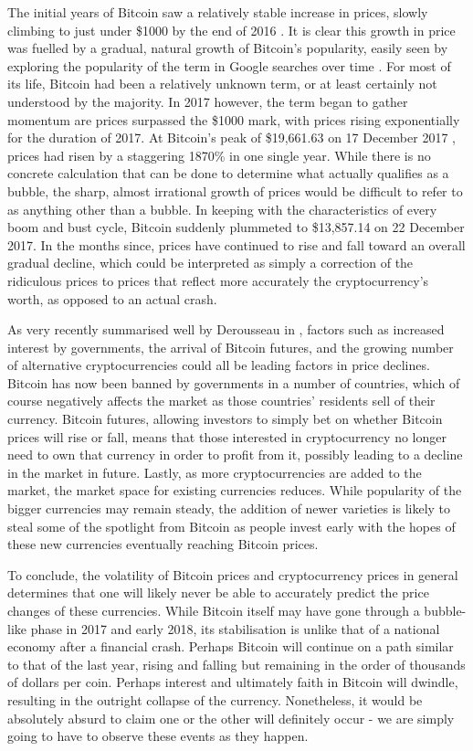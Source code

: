 The initial years of Bitcoin saw a relatively stable increase in prices, slowly climbing to just under \$1000 by the end of 2016 \cite{coindeskprices}. It is clear this growth in price was fuelled by a gradual, natural growth of Bitcoin's popularity, easily seen by exploring the popularity of the term in Google searches over time \cite{googletrendbtc}. For most of its life, Bitcoin had been a relatively unknown term, or at least certainly not understood by the majority. In 2017 however, the term began to gather momentum are prices surpassed the \$1000 mark, with prices rising exponentially for the duration of 2017. At Bitcoin's peak of \$19,661.63 on 17 December 2017 \cite{coindeskprices}, prices had risen by a staggering 1870\% in one single year. While there is no concrete calculation that can be done to determine what actually qualifies as a bubble, the sharp, almost irrational growth of prices would be difficult to refer to as anything other than a bubble. In keeping with the characteristics of every boom and bust cycle, Bitcoin suddenly plummeted to \$13,857.14 on 22 December 2017. In the months since, prices have continued to rise and fall toward an overall gradual decline, which could be interpreted as simply a correction of the ridiculous prices to prices that reflect more accurately the cryptocurrency's worth, as opposed to an actual crash. 

As very recently summarised well by Derousseau in \cite{airoutbubble}, factors such as increased interest by governments, the arrival of Bitcoin futures, and the growing number of alternative cryptocurrencies could all be leading factors in price declines. Bitcoin has now been banned by governments in a number of countries, which of course negatively affects the market as those countries' residents sell of their currency. Bitcoin futures, allowing investors to simply bet on whether Bitcoin prices will rise or fall, means that those interested in cryptocurrency no longer need to own that currency in order to profit from it, possibly leading to a decline in the market in future. Lastly, as more cryptocurrencies are added to the market, the market space for existing currencies reduces. While popularity of the bigger currencies may remain steady, the addition of newer varieties is likely to steal some of the spotlight from Bitcoin as people invest early with the hopes of these new currencies eventually reaching Bitcoin prices.

To conclude, the volatility of Bitcoin prices and cryptocurrency prices in general determines that one will likely never be able to accurately predict the price changes of these currencies. While Bitcoin itself may have gone through a bubble-like phase in 2017 and early 2018, its stabilisation is unlike that of a national economy after a financial crash. Perhaps Bitcoin will continue on a path similar to that of the last year, rising and falling but remaining in the order of thousands of dollars per coin. Perhaps interest and ultimately faith in Bitcoin will dwindle, resulting in the outright collapse of the currency. Nonetheless, it would be absolutely absurd to claim one or the other will definitely occur - we are simply going to have to observe these events as they happen.

